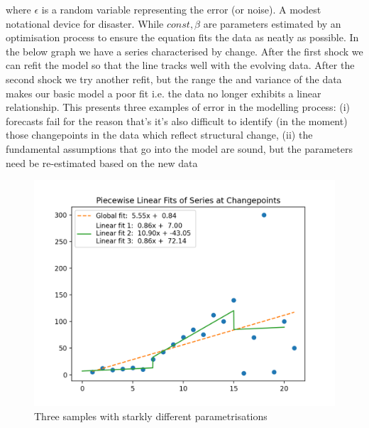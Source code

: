\documentclass[10pt,a4paper,notitlepage, twocolumn]{article}
\begin{document}
\noindent where $\epsilon$ is a random variable representing the error (or noise). A modest notational device for disaster. While $const, \beta$ are parameters estimated by an optimisation process to ensure the equation fits the data as neatly as possible. In the below graph we have a series characterised by change. After the first shock we can refit the model so that the line tracks well with the evolving data. After the second shock we try another refit, but the range the and variance of the data makes our basic model a poor fit i.e. the data no longer exhibits a linear relationship. This presents three examples of error in the modelling process: (i) forecasts fail for the reason that's it's also difficult to identify (in the moment) those changepoints in the data which reflect structural change, (ii)  the fundamental assumptions that go into the model are sound, but the parameters need be re-estimated based on the new data
\begin{figure}[H]
  \includegraphics[width=\linewidth]{./Plots/piecewise_linear_fits.png}
  \caption{Three samples with starkly different parametrisations}
\end{figure}
\end{document}

